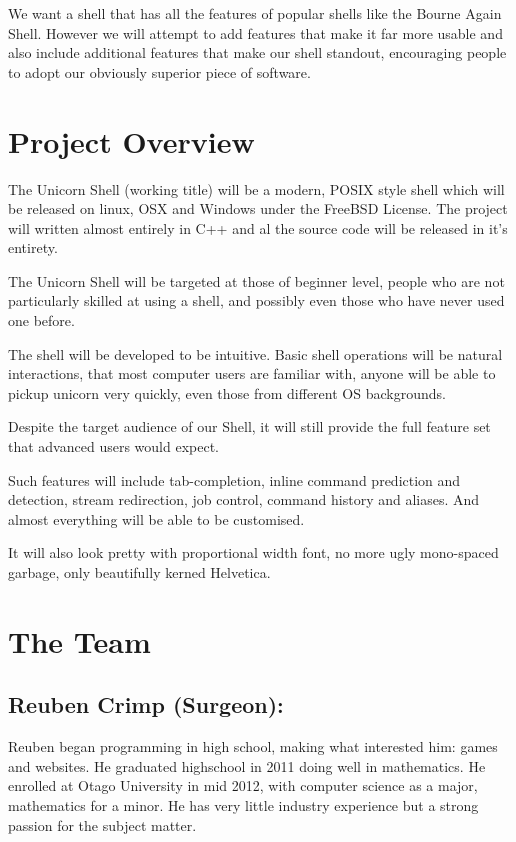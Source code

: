 \documentclass[a4paper,12pt]{article}
\begin{document}
We want a shell that has all the features of popular shells like the Bourne Again Shell. However we will attempt to add features that make it far more usable and also include additional features that make our shell standout, encouraging people to adopt our obviously superior piece of software.

\section*{Project Overview}

The Unicorn Shell (working title) will be a modern, POSIX style shell which will be released on linux, OSX and Windows under the FreeBSD License. The project will written almost entirely in C++ and al the source code will be released in it's entirety.

The Unicorn Shell will be targeted at those of beginner level, people who are not particularly skilled at using a shell, and possibly even those who have never used one before.

The shell will be developed to be intuitive. Basic shell operations will be natural interactions, that most computer users are familiar with, anyone will be able to pickup unicorn very quickly, even those from different OS backgrounds.

Despite the target audience of our Shell, it will still provide the full feature set that advanced users would expect.

Such features will include tab-completion, inline command prediction and detection, stream redirection, job control,  command history and aliases. And almost everything will be able to be customised.

It will also look pretty with proportional width font, no more ugly mono-spaced garbage, only beautifully kerned Helvetica. 

\pagebreak
\section*{The Team}

\subsection*{Reuben Crimp (Surgeon):}
Reuben began programming in high school, making what interested him: games and websites. He graduated highschool in 2011 doing well in mathematics. He enrolled at Otago University in mid 2012, with computer science as a major, mathematics for a minor. He has very little industry experience but a strong passion for the subject matter.
\end{document}

